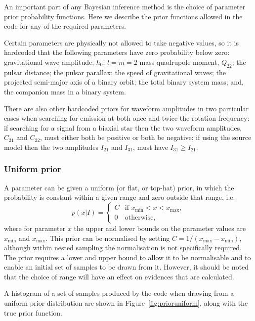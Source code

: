 An important part of any Bayesian inference method is the choice of parameter prior probability functions. Here we describe the prior
functions allowed in the code for any of the required parameters.

Certain parameters are physically not allowed to take negative values, so it is hardcoded that the following parameters
have zero probability below zero: gravitational wave amplitude, $h_0$; $l=m=2$ mass quadrupole moment, $Q_{22}$; the pulsar
distance; the pulsar parallax; the speed of gravitational waves; the projected semi-major axis of a binary orbit; the total
binary system mass; and, the companion mass in a binary system.

There are also other hardcoded priors for waveform amplitudes in two particular cases when searching for emission at both once
and twice the rotation frequency: if searching for a signal from a biaxial star then the two waveform amplitudes, $C_{21}$ and $C_{22}$,
must either both be positive or both be negative; if using the source model then the two amplitudes $I_{21}$ and $I_{31}$, must
have $I_{31} \geqslant I_{21}$.

\subsubsection{Uniform prior}\label{sec:uniformprior}

A parameter can be given a uniform (or flat, or top-hat) prior, in which the probability is constant within a given
range and zero outside that range, i.e.
\begin{equation}
p(x|I) = \begin{cases}
             C & \text{if } x_{\text{min}} < x < x_{\text{max}}, \\
             0 & \text{otherwise},
            \end{cases}
\end{equation}
where for parameter $x$ the upper and lower bounds on the parameter values are $x_{\text{min}}$ and $x_{\text{max}}$. This
prior can be normalised by setting $C = 1/(x_{\text{max}}-x_{\text{min}})$, although within nested sampling the normalisation
is not specifically required. The prior requires a lower and upper bound to allow it to be normalisable and to enable
an initial set of samples to be drawn from it. However, it should be noted that the choice of range will have an
effect on evidences that are calculated.

A histogram of a set of samples produced by the code when drawing from a uniform prior distribution are shown in Figure~\ref{fig:prioruniform},
along with the true prior function.


